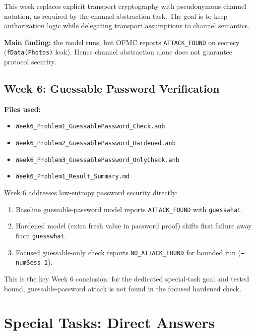 \documentclass[11pt,a4paper]{article}
\begin{document}
This week replaces explicit transport cryptography with pseudonymous channel notation,
as required by the channel-abstraction task.
The goal is to keep authorization logic while delegating transport assumptions to channel semantics.

\textbf{Main finding:}
the model runs, but OFMC reports \texttt{ATTACK\_FOUND} on secrecy (\texttt{fData(Photos)} leak).
Hence channel abstraction alone does not guarantee protocol security.

\subsection{Week 6: Guessable Password Verification}

\textbf{Files used:}
\begin{itemize}[leftmargin=1.2em]
  \item \texttt{Week6\_Problem1\_GuessablePassword\_Check.anb}
  \item \texttt{Week6\_Problem2\_GuessablePassword\_Hardened.anb}
  \item \texttt{Week6\_Problem3\_GuessablePassword\_OnlyCheck.anb}
  \item \texttt{Week6\_Problem1\_Result\_Summary.md}
\end{itemize}

Week 6 addresses low-entropy password security directly:
\begin{enumerate}[leftmargin=1.4em]
  \item Baseline guessable-password model reports \texttt{ATTACK\_FOUND} with \texttt{guesswhat}.
  \item Hardened model (extra fresh value in password proof) shifts first failure away from \texttt{guesswhat}.
  \item Focused guessable-only check reports \texttt{NO\_ATTACK\_FOUND} for bounded run (\texttt{--numSess 1}).
\end{enumerate}

This is the key Week 6 conclusion: for the dedicated special-task goal and tested bound,
guessable-password attack is not found in the focused hardened check.

\section{Special Tasks: Direct Answers}
\end{document}
